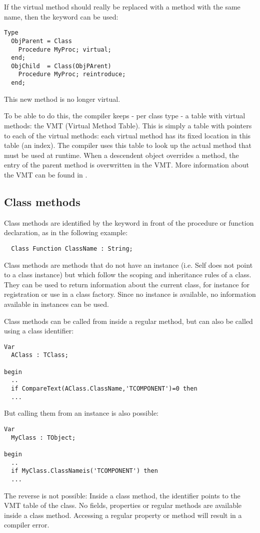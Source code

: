 If the virtual method should really be replaced with a method with the 
same name, then the  keyword can be used:
\begin{verbatim}
Type 
  ObjParent = Class
    Procedure MyProc; virtual;
  end;
  ObjChild  = Class(ObjPArent)
    Procedure MyProc; reintroduce;
  end;
\end{verbatim}
This new method is no longer virtual.

To be able to do this, the compiler keeps - per class type - a table with
virtual methods: the VMT (Virtual Method Table). This is simply a table 
with pointers to each of the virtual methods: each virtual method has its
fixed location in this table (an index). The compiler uses this table to 
look up the actual method that must be used at runtime. When a descendent object
overrides a method, the entry of the parent method is overwritten in the
VMT. More information about the VMT can be found in \progref.


\subsection{Class methods}
Class methods are identified by the keyword  in front of the
procedure or function declaration, as in the following example:
\begin{verbatim}
  Class Function ClassName : String;
\end{verbatim}
Class methods are methods that do not have an instance (i.e. Self does not
point to a class instance) but which follow the scoping and inheritance 
rules of a class. They can be used to return information about the current
class, for instance for registration or use in a class factory. Since no 
instance is available, no information available in instances can be used.

Class methods can be called from inside a regular method, but can also be called 
using a class identifier:
\begin{verbatim}
Var
  AClass : TClass;

begin
  ..
  if CompareText(AClass.ClassName,'TCOMPONENT')=0 then
  ...

\end{verbatim}
But calling them from an instance is also possible:
\begin{verbatim}
Var
  MyClass : TObject;

begin
  ..
  if MyClass.ClassNameis('TCOMPONENT') then
  ...
\end{verbatim}
The reverse is not possible: Inside a class method, the  identifier 
points to the VMT table of the class. No fields, properties or 
regular methods are available inside a class method. Accessing a regular 
property or method will result in a compiler error. 

